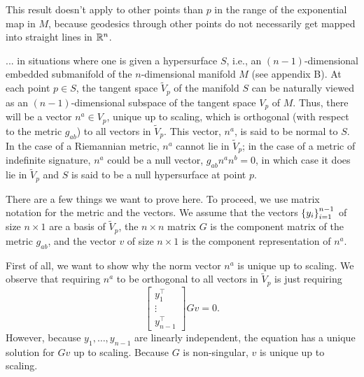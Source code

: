 \documentclass{note}
\numberwithin{equation}{chapter}
\begin{document}
This result doesn't apply to other points than $p$ in the range of the
exponential map in $M$, because geodesics through other points do not
necessarily get mapped into straight lines in $\mathbb{R}^n$.

\begin{quotebar}
    ... in situations where one is given a hypersurface $S$, i.e., an $(n -
        1)$-dimensional embedded submanifold of the $n$-dimensional manifold $M$ (see
    appendix B). At each point $p \in S$, the tangent space $\tilde{V}_p$ of the
    manifold $S$ can be naturally viewed as an $(n - 1)$-dimensional subspace of
    the tangent space $V_p$ of $M$. Thus, there will be a vector $n^a \in V_p$,
    unique up to scaling, which is orthogonal (with respect to the metric $g_{ab}$)
    to all vectors in $\tilde{V}_p$. This vector, $n^a$, is said to be normal to
    $S$. In the case of a Riemannian metric, $n^a$ cannot lie in $\tilde{V}_p$; in
    the case of a metric of indefinite signature, $n^a$ could be a null vector,
    $g_{ab}n^a n^b = 0$, in which case it does lie in $\tilde{V}_p$ and $S$ is said
    to be a null hypersurface at point $p$.
\end{quotebar}

There are a few things we want to prove here. To proceed, we use matrix
notation for the metric and the vectors. We assume that the vectors
$\set{y_i}_{i=1}^{n-1}$ of size $n\times 1$ are a basis of $\tilde{V}_p$, the
$n\times n$ matrix $G$ is the component matrix of the metric $g_{ab}$, and the
vector $v$ of size $n\times 1$ is the component representation of $n^a$.

First of all, we want to show why the norm vector $n^a$ is unique up to
scaling. We observe that requiring $n^a$ to be orthogonal to all vectors in
$\tilde{V}_p$ is just requiring
\begin{equation}
    \begin{bmatrix}
        y_1^\top \\
        \vdots   \\
        y_{n-1}^\top
    \end{bmatrix}
    Gv = 0. \label{norm-vector-being-in-hypersurface}
\end{equation}
However, because $y_1, \dots, y_{n-1}$ are linearly independent, the equation
has a unique solution for $Gv$ up to scaling. Because $G$ is non-singular, $v$
is unique up to scaling.
\end{document}
